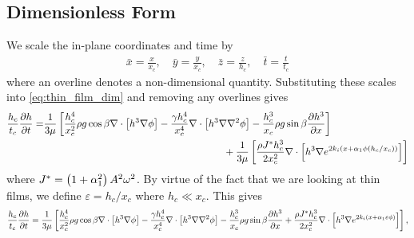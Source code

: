 \subsection{Dimensionless Form}
We scale the in-plane coordinates and time by 
\begin{gather*}
    \bar{x} = \frac{x}{x_c}, \quad \bar{y} = \frac{y}{x_c}, \quad \bar{z} = \frac{z}{h_c}, \quad \bar{t} = \frac{t}{t_c}
\end{gather*}
where an overline denotes a non-dimensional quantity. Substituting these scales 
into \cref{eq:thin_film_dim} and removing any overlines gives 
\begin{align}
    \begin{split}
        \frac{h_c}{t_c} \frac{\partial h}{\partial t} = &\frac{1}{3\mu} \left[ 
            \frac{h_c^4}{x_c^2} \rho g \cos \beta \nabla \cdot \left[ h^3\nabla\phi \right] - 
            \frac{\gamma h_c^4}{x_c^4} \nabla \cdot \left[ h^3 \nabla \nabla^2 \phi \right] - 
            \frac{h_c^3}{x_c} \rho g \sin\beta \frac{\partial h^3}{\partial x}
         \right]\\
        &\qquad \qquad \qquad \qquad \qquad \qquad \qquad \qquad \qquad + \frac{1}{3\mu} \left[  
            \frac{\rho J^* h_c^3}{2 x_c^2} \nabla \cdot \left[ h^3 \nabla e^{2k_i \left( x + \alpha_1 \phi \left( h_c/x_c \right) \right)} \right]
         \right]
    \end{split}
    \label{eq:nondim_first}
\end{align}
where $J^* = \left( 1+\alpha_1^2 \right)A^2\omega^2$. 
By virtue of the fact that we are looking at thin films, we define $\varepsilon = h_c / x_c$ where $h_c \ll x_c$. 
This gives
\begin{gather*}
    \nonumber \frac{h_c}{t_c} \frac{\partial h}{\partial t} = \frac{1}{3\mu} \left[ 
        \frac{h_c^4}{x_c^2} \rho g \cos \beta \nabla \cdot \left[ h^3\nabla\phi \right] - 
        \frac{\gamma h_c^4}{x_c^4} \nabla \cdot \left[ h^3 \nabla \nabla^2 \phi \right] - 
        \frac{h_c^3}{x_c} \rho g \sin\beta \frac{\partial h^3}{\partial x} + 
        \frac{\rho J^* h_c^3}{2 x_c^2} \nabla \cdot \left[ h^3 \nabla e^{2k_i \left( x + \alpha_1 \varepsilon \phi \right)} \right]
     \right],
\end{gather*}
